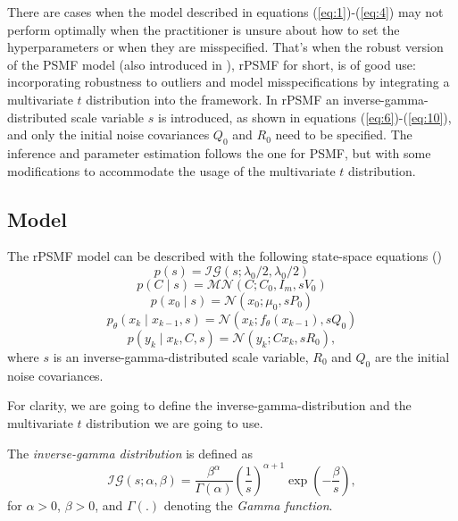 \documentclass{mldsmsc}
\begin{document}
There are cases when the model described in equations (\ref{eq:1})-(\ref{eq:4}) may not perform optimally when the practitioner is unsure about how to set the hyperparameters or when they are misspecified. That's when the robust version of the PSMF model (also introduced in \cite{akyildiz2021probabilistic}), rPSMF for short, is of good use: incorporating robustness to outliers and model misspecifications by integrating a multivariate $t$ distribution into the framework. In rPSMF an inverse-gamma-distributed scale variable $s$ is introduced, as shown in equations (\ref{eq:6})-(\ref{eq:10}), and only the initial noise covariances $Q_0$ and $R_0$ need to be specified. The inference and parameter estimation follows the one for PSMF, but with some modifications to accommodate the usage of the multivariate $t$ distribution.

\subsection{Model}

The rPSMF model can be described with the following state-space equations (\cite{akyildiz2021probabilistic})
\begin{equation}\label{eq:6}
    p(s) = \mathcal{IG}(s; \lambda_0 / 2, \lambda_0 / 2)
\end{equation}
\begin{equation}\label{eq:7}
    p(C \mid s) = \mathcal{MN}(C; C_0, I_m, sV_0)
\end{equation}
\begin{equation}\label{eq:8}
    p(x_0 \mid s) = \mathcal{N}(x_0; \mu_0, sP_0)
\end{equation}
\begin{equation}\label{eq:9}
    p_{\theta}(x_k \mid x_{k-1}, s) = \mathcal{N}(x_k; f_{\theta}(x_{k-1}), sQ_0)
\end{equation}
\begin{equation}\label{eq:10}
    p(y_k \mid x_k, C, s) = \mathcal{N}(y_k; Cx_k, sR_0),
\end{equation}
where $s$ is an inverse-gamma-distributed scale variable, $R_0$ and $Q_0$ are the initial noise covariances. \newline

\noindent For clarity, we are going to define the inverse-gamma-distribution and the multivariate $t$ distribution we are going to use.

\begin{definition}
    The \textit{inverse-gamma distribution} is defined as
    \begin{equation}
        \mathcal{IG}(s; \alpha, \beta) = \frac{\beta ^ \alpha}{\Gamma(\alpha)} \left(\frac{1}{s}\right)^{\alpha + 1} \exp \left(-\frac{\beta}{s}\right),
    \end{equation}
    for $\alpha > 0$, $\beta > 0$, and $\Gamma(.)$ denoting the \textit{Gamma function}.
\end{definition}
\end{document}
